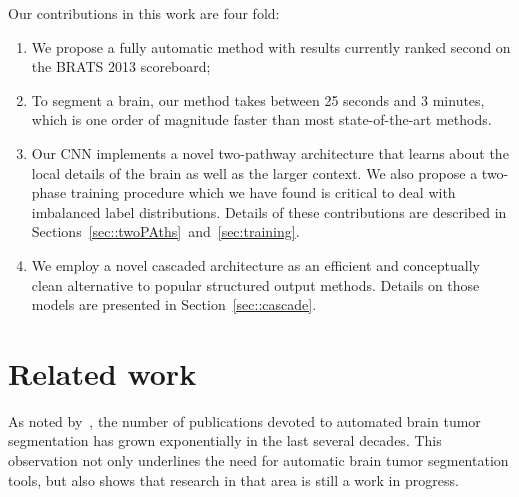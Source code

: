 \documentclass[final,5p,times,twocolumn]{elsarticle}
\begin{document}
Our contributions in this work are four fold:
%
\begin{enumerate}
\item We propose a fully automatic method with results currently ranked second on the BRATS 2013 scoreboard; 
\item To segment a brain, our method takes between 25 seconds and 3 minutes, which is one order of magnitude faster than most state-of-the-art methods. %
\item Our CNN implements a novel two-pathway architecture that learns about the local details of the brain as well as the larger context.  We also propose a two-phase training procedure which we have found is critical to deal with imbalanced label distributions.  Details of these contributions are described in Sections~\ref{sec::twoPAths}~and~\ref{sec:training}.
\item We employ a novel cascaded architecture as an efficient and conceptually clean alternative to popular structured output methods.
Details on those models are presented in Section~\ref{sec::cascade}.
\end{enumerate}
%





\section{Related work}
\label{sec:related_work}



As noted by~\citet{Menze2014}, the number of publications devoted to automated brain tumor segmentation has grown exponentially in the last several decades. This observation %
not only underlines the need for automatic brain tumor segmentation tools, but also shows that research in that area is still a work in progress.
\end{document}
